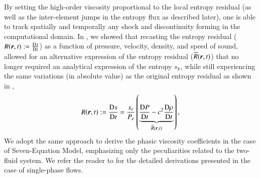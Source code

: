 \documentclass[preprint,10pt]{elsarticle}
\begin{document}
By setting the high-order viscosity proportional to the local entropy residual (as well as the inter-element jumps in the entropy flux as described later),
one is able to track spatially and temporally any shock and discontinuity forming in the computational domain. 
In \cite{DelchiniCompFluid2014-euler}, we showed that recasting the entropy residual ($R(\boldsymbol r,t)  := \frac{\textrm{D} s}{\textrm{D} t}$) 
as a function of pressure, velocity, density, and speed of 
sound, allowed for an alternative expression of the entropy residual ($\widetilde{R}(\boldsymbol r,t)$)
that no longer required an analytical expression of the entropy $s_k$, while still experiencing the same variations (in absolute value) 
as the original entropy residual as shown in ,
%
\begin{equation}\label{eq:ent-res-sem}
R(\boldsymbol r,t)  := \frac{\textrm{D} s}{\textrm{D} t} = \frac{s_e}{P_e} \left( \underbrace{\frac{\textrm{D} P}{\textrm{D} t} - c^2 \frac{\textrm{D} \rho}{\textrm{D} t} }_{\widetilde{R}(\boldsymbol r,t)} \right) ,
\end{equation} 
%
We adopt the same approach to derive the phasic viscosity coefficients in the case of Seven-Equation Model, emphasizing only the 
peculiarities related to the two-fluid system. We refer the reader to \cite{DelchiniCompFluid2014-euler} for the detailed derivations presented in the case of
single-phase flows.
\end{document}
